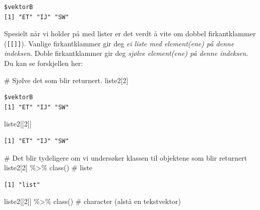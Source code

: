 \documentclass[
  letterpaper,
  DIV=11,
  numbers=noendperiod]{scrartcl}
\newenvironment{Shaded}{\begin{snugshade}}{\end{snugshade}}
\newcommand{\CommentTok}[1]{\textcolor[rgb]{0.37,0.37,0.37}{#1}}
\newcommand{\DecValTok}[1]{\textcolor[rgb]{0.68,0.00,0.00}{#1}}
\newcommand{\FunctionTok}[1]{\textcolor[rgb]{0.28,0.35,0.67}{#1}}
\newcommand{\NormalTok}[1]{\textcolor[rgb]{0.00,0.23,0.31}{#1}}
\newcommand{\SpecialCharTok}[1]{\textcolor[rgb]{0.37,0.37,0.37}{#1}}
\begin{document}
\begin{verbatim}
$vektorB
[1] "ET" "IJ" "SW"
\end{verbatim}

Spesielt når vi holder på med lister er det verdt å vite om dobbel
firkantklammer (\texttt{{[}{[}{]}{]}}). Vanlige firkantklammer gir deg
\emph{ei liste med element(ene) på denne indeksen}. Doble firkantklammer
gir deg \emph{sjølve element(ene) på denne indeksen}. Du kan se
forskjellen her:

\begin{Shaded}
\begin{Highlighting}[]
\CommentTok{\# Sjølve det som blir returnert.}
\NormalTok{liste2[}\DecValTok{2}\NormalTok{] }
\end{Highlighting}
\end{Shaded}

\begin{verbatim}
$vektorB
[1] "ET" "IJ" "SW"
\end{verbatim}

\begin{Shaded}
\begin{Highlighting}[]
\NormalTok{liste2[[}\DecValTok{2}\NormalTok{]]}
\end{Highlighting}
\end{Shaded}

\begin{verbatim}
[1] "ET" "IJ" "SW"
\end{verbatim}

\begin{Shaded}
\begin{Highlighting}[]
\CommentTok{\# Det blir tydeligere om vi undersøker klassen til objektene som blir returnert}
\NormalTok{liste2[}\DecValTok{2}\NormalTok{] }\SpecialCharTok{\%\textgreater{}\%} \FunctionTok{class}\NormalTok{() }\CommentTok{\# liste}
\end{Highlighting}
\end{Shaded}

\begin{verbatim}
[1] "list"
\end{verbatim}

\begin{Shaded}
\begin{Highlighting}[]
\NormalTok{liste2[[}\DecValTok{2}\NormalTok{]] }\SpecialCharTok{\%\textgreater{}\%} \FunctionTok{class}\NormalTok{() }\CommentTok{\# character (alstå en tekstvektor)}
\end{Highlighting}
\end{Shaded}
\end{document}
